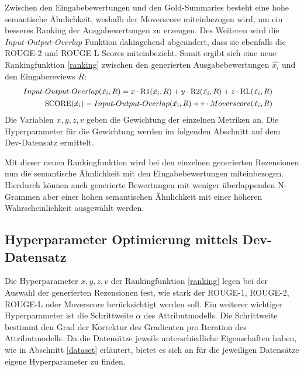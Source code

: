 Zwischen den Eingabebewertungen und den Gold-Summaries besteht eine hohe semantische Ähnlichkeit, weshalb der Moverscore miteinbezogen wird, um ein besseres Ranking der Ausgabewertungen zu erzeugen.
Des Weiteren wird die \textit{Input-Output-Overlap} Funktion dahingehend abgeändert, dass sie ebenfalls die ROUGE-2 und ROUGE-L Scores miteinbezieht.
Somit ergibt sich eine neue Rankingfunktion \ref{ranking} zwischen den generierten Ausgabebewertungen $\hat{x_i}$ und den Eingabereviews $R$:
\begin{align}
    \small
    \begin{split}
    Input\text{-}Output\text{-}Overlap(\hat{x_i}, R) &= x \cdot \text{R1}(\hat{x_i}, R)+y\cdot \text{R2}(\hat{x_i}, R)+z\cdot \text{RL}(\hat{x_i}, R) 
\end{split}\\
\small
\begin{split}
        \label{ranking}
    \text{SCORE}(\hat{x_i}) &= Input\text{-}Output\text{-}Overlap(\hat{x_i}, R) + v \cdot Moverscore(\hat{x_i}, R)
\end{split}
\end{align}
Die Variablen $x,y,z,v$ geben die Gewichtung der einzelnen Metriken an. 
Die Hyperparameter für die Gewichtung werden im folgenden Abschnitt auf dem Dev-Datensatz ermittelt.

Mit dieser neuen Rankingfunktion wird bei den einzelnen generierten Rezensionen nun die semantische Ähnlichkeit mit den Eingabebewertungen miteinbezogen. 
Hierdurch können auch generierte Bewertungen mit weniger überlappenden N-Grammen aber einer hohen semantischen Ähnlichkeit mit einer höheren Wahrscheinlichkeit ausgewählt werden.

\pagebreak
\subsection{Hyperparameter Optimierung mittels Dev-Datensatz}
\label{eval_pplm}
Die Hyperparameter $x,y,z,v$ der Rankingfunktion \ref{ranking} legen bei der Auswahl der generierten Rezensionen fest, wie stark der ROUGE-1, ROUGE-2, ROUGE-L oder Moverscore berücksichtigt werden soll.
Ein weiterer wichtiger Hyperparameter ist die Schrittweite $\alpha$ des Attributmodells. Die Schrittweite bestimmt den Grad der Korrektur des Gradienten pro Iteration des Attributmodells. 
Da die Datensätze jeweils unterschiedliche Eigenschaften haben, wie in Abschnitt \ref{dataset} erläutert, bietet es sich an für die jeweiligen Datensätze eigene Hyperparameter zu finden.

